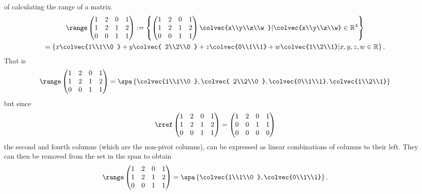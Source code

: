 \begin{example}{ of calculating the range of a matrix.}
\begin{gather*}\range  
\begin{pmatrix} 
1&2&0&1\\
1&2&1&2\\
0&0&1&1
\end{pmatrix} 
:= 
\left\{ 
\begin{pmatrix} 
1&2&0&1\\
1&2&1&2\\
0&0&1&1
\end{pmatrix} 
\colvec{x\\y\\z\\w } | \colvec{x\\y\\z\\w} \in \mathbb{R}^4 \right\}
\\=
\left\{   
x\colvec{1\\1\\0 } +y \colvec{ 2\\2\\0 } +z \colvec{0\\1\\1} + w\colvec{1\\2\\1} \middle| x,y,z,w \in \mathbb{R}\right\}
.\end{gather*}
That is 
\[
\range  
\begin{pmatrix} 
1&2&0&1\\
1&2&1&2\\
0&0&1&1
\end{pmatrix} 
= 
\spa \left\{   
\colvec{1\\1\\0 } , \colvec{ 2\\2\\0 } , \colvec{0\\1\\1}, \colvec{1\\2\\1} \right\}
\]
but since 
\[\rref\begin{pmatrix} 
1&2&0&1\\
1&2&1&2\\
0&0&1&1
\end{pmatrix} 
=\begin{pmatrix} 
1&2&0&1\\
0&0&1&1\\
0&0&0&0
\end{pmatrix} 
\]
the second and fourth columns (which are the non-pivot columns), can be expressed as linear combinations of columns to their left. 
They can then be removed from the set in the span to obtain
\[\range  
\begin{pmatrix} 
1&2&0&1\\
1&2&1&2\\
0&0&1&1
\end{pmatrix} 
= \spa \left\{   
\colvec{1\\1\\0 } , \colvec{0\\1\\1} \right\} .
\]
\end{example}

